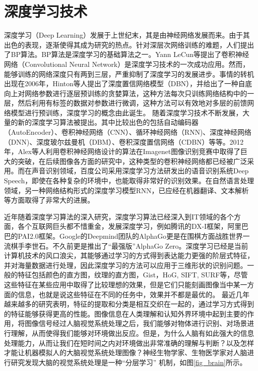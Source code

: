 \documentclass[twoside,UTF8]{nputhesis}
\begin{document}
\section{深度学习技术}

深度学习（Deep Learning）发展于上世纪末，其是由神经网络发展而来。由于其出色的表现，逐渐使得其成为研究的热点。针对深层次网络训练的难题，人们提出了BP算法\cite{Rumelhart1988Learning}。BP算法是深度学习的基础算法之一。Yann LeCun等\cite{Lecun2014Backpropagation}提出了卷积神经网络（Convolutional Neural Network）是深度学习技术的一次成功应用。然而，能够训练的网络深度只有两到三层，严重抑制了深度学习的发展进步。事情的转机出现在2006年，Hinton等人\cite{Hinton2006A}提出了深度置信网络模型（DBN），并给出了一种自底向上对网络参数进行逐层预训练的贪婪算法，这种方法每次只训练网络结构中的一层，然后利用有标签的数据对参数进行微调，这种方法可以有效地对多层的前馈网络模型进行预训练，深度学习的概念由此诞生。
%
随着深度学习技术不断发展，大量的新的深度学习算法被提出。其中比较出色的包括自动编码器（AutoEncoder）、卷积神经网络（CNN）、循环神经网络（RNN)、深度神经网络（DNN)、深度玻尔兹曼机（DBM）、卷积深度置信网络（CDBN）等等。2012年，Alex等人利用卷积神经网络设计的算法在Imagenet图像识别竞赛中取得了巨大的突破\cite{Krizhevsky2017ImageNet}，在后续图像各方面的研究中，这种类型的卷积神经网络都已经被广泛采用。而在声音识别领域，百度公司采用深度学习方法研发出的语音识别系统Deep Speech，即使在各种复杂的环境中，也能取得非常好的识别效果\cite{Niu2014Context}。在自然语言处理领域，另一种网络结构形式的深度学习模型RNN，已应经在机器翻译、文本解析等方面取得了非常大的进展。

近年随着深度学习算法的深入研究，深度学习算法已经深入到IT领域的各个方面，各个互联网巨头都不惜重金，发展深度学习，例如腾讯的DX-I框架，阿里巴巴的PAI2.0框架。Google的Deepmind团队的AlphaGo更是在围棋方面战胜世界一流棋手李世石。不久前更是推出了``最强版”AlphaGo Zero。深度学习已经是当前计算机技术的风口浪尖，其能够通过学习的方式得到表达能力更强的阶层式特征，并对海量数据进行处理，因此深度学习的方法可以应用于三维形状的识别问题。一般的特征包括颜色的直方图，纹理的直方图，Gist，HoG, SIFT, SURF等，尽管这些特征在某些应用中取得了比较理想的效果，但是它们只能刻画图像当中某一方面的信息，也就是说这些特征在不同的任务中，效果并不都是最优的。
%
最近几年越来越多的研究表明，特征的提取和分类是相互交织在一起的，通过学习方式得到的特征能够获得更高的性能。图像信息在人类理解和认知外界环境中起到主要的作用，将图像信号经过人脑视觉系统处理之后，我们能够对物体进行识别、对场景进行理解，从而使得我们能够对环境做出反应。但是，为什么人脑有如此强大的信息处理能力，从而让我们在短时间之内对环境做出非常准确的理解与判断？以及怎样才能让机器模拟人的大脑视觉系统处理图像？神经生物学家、生物医学家对人脑进行研究发现大脑的视觉系统处理是一种“分层学习” 机制，如图\ref{fig_brain}所示。
\end{document}
